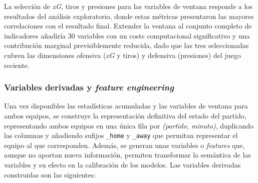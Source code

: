 La selección de \textit{xG}, tiros y presiones para las variables de ventana responde a los resultados del análisis exploratorio, donde estas métricas presentaron las mayores correlaciones con el resultado final. Extender la ventana al conjunto completo de indicadores añadiría 30 variables con un coste computacional significativo y una contribución marginal previsiblemente reducida, dado que las tres seleccionadas cubren las dimensiones ofensiva (\textit{xG} y tiros) y defensiva (presiones) del juego reciente.

\subsubsection{Variables derivadas y \textit{feature engineering}}

Una vez disponibles las estadísticas acumuladas y las variables de ventana para ambos equipos, se construye la representación definitiva del estado del partido, representando ambos equipos en una única fila por \textit{(partido, minuto)}, duplicando las columnas y añadiendo sufijos \texttt{\_home} y \texttt{\_away} que permitan representar el equipo al que corresponden. Además, se generan unas variables o \textit{features} que, aunque no aportan nueva información, permiten transformar la semántica de las variables y su efecto en la calibración de los modelos. Las variables derivadas construidas son las siguientes:

